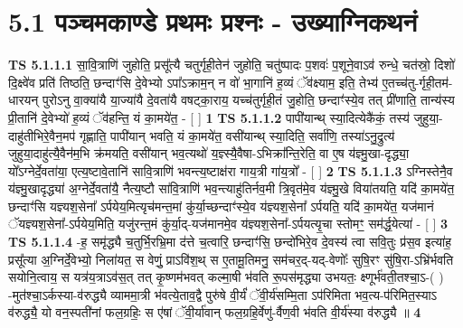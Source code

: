 \documentclass[17pt]{extarticle}
\begin{document}
     \section*{ 5.1      पञ्चमकाण्डे प्रथमः प्रश्नः - उख्याग्निकथनं }
                                        \textbf{ TS 5.1.1.1} \newline
                  सा॒वि॒त्राणि॑ जुहोति॒ प्रसू᳚त्यै चतुर्गृही॒तेन॑ जुहोति॒ चतु॑ष्पादः प॒शवः॑ प॒शूने॒वाऽव॑ रुन्धे॒ चत॑स्रो॒ दिशो॑ दि॒क्ष्वे॑व प्रति॑ तिष्ठति॒ छन्दाꣳ॑सि दे॒वेभ्यो ऽपा᳚ऽक्राम॒न् न वो॑ भा॒गानि॑ ह॒व्यं ॅव॑क्ष्याम॒ इति॒ तेभ्य॑ ए॒तच्च॑तु-र्गृही॒तम॑-धारयन् पुरोऽनु वा॒क्या॑यै या॒ज्या॑यै दे॒वता॑यै वषट्का॒राय॒ यच्च॑तुर्गृही॒तं जु॒होति॒ छन्दाꣳ॑स्ये॒व तत् प्री॑णाति॒ तान्य॑स्य प्री॒तानि॑ दे॒वेभ्यो॑ ह॒व्यं ॅव॑हन्ति॒ यं का॒मये॑त॒ - [  ] \textbf{  1} \newline
                  \newline
                                \textbf{ TS 5.1.1.2} \newline
                  पापी॑यान्थ् स्या॒दित्येकै॑कं॒ तस्य॑ जुहुया॒-दाहु॑तीभिरे॒वैन॒मप॑ गृह्णाति॒ पापी॑यान् भवति॒ यं का॒मये॑त॒ वसी॑यान्थ् स्या॒दिति॒ सर्वा॑णि॒ तस्या॑ऽनु॒द्रुत्य॑ जुहुया॒दाहु॑त्यै॒वैन॑म॒भि क्र॑मयति॒ वसी॑यान् भव॒त्यथो॑ य॒ज्ञ्स्यै॒वैषा-ऽभिक्रा᳚न्ति॒रेति॒ वा ए॒ष य॑ज्ञ्मु॒खा-दृद्ध्या॒ यो᳚ऽग्नेर्दे॒वता॑या॒ एत्य॒ष्टावे॒तानि॑ सावि॒त्राणि॑ भवन्त्य॒ष्टाक्ष॑रा गाय॒त्री गा॑य॒त्रो᳚ - [  ] \textbf{  2} \newline
                  \newline
                                \textbf{ TS 5.1.1.3} \newline
                  ऽग्निस्तेनै॒व य॑ज्ञ्मु॒खादृद्ध्या॑ अ॒ग्नेर्दे॒वता॑यै॒ नैत्य॒ष्टौ सा॑वि॒त्राणि॑ भव॒न्त्याहु॑तिर्नव॒मी त्रि॒वृत॑मे॒व य॑ज्ञ्मु॒खे विया॑तयति॒ यदि॑ का॒मये॑त॒ छन्दाꣳ॑सि यज्ञ्यश॒सेना᳚ ऽर्पयेय॒मित्यृच॑मन्त॒मां कु॑र्या॒च्छन्दाꣳ॑स्ये॒व य॑ज्ञ्यश॒सेना᳚ ऽर्पयति॒ यदि॑ का॒मये॑त॒ यज॑मानं ॅयज्ञ्यश॒सेना᳚-ऽर्पयेय॒मिति॒ यजु॑रन्त॒मं कु॑र्या॒द्-यज॑मानमे॒व य॑ज्ञ्यश॒सेना᳚-ऽर्पयत्यृ॒चा स्तोमꣳ॒॒ सम॑र्द्ध॒येत्या॑ - [  ] \textbf{  3} \newline
                  \newline
                                \textbf{ TS 5.1.1.4} \newline
                  -ह॒ समृ॑द्ध्यै च॒तुर्भि॒रभ्रि॒मा द॑त्ते च॒त्वारि॒ छन्दाꣳ॑सि॒ छन्दो॑भिरे॒व दे॒वस्य॑ त्वा सवि॒तुः प्र॑स॒व इत्या॑ह॒ प्रसू᳚त्या अ॒ग्निर्दे॒वेभ्यो॒ निला॑यत॒ स वेणुं॒ प्राऽवि॑श॒थ् स ए॒तामू॒तिमनु॒ सम॑चर॒द्-यद्-वेणोः᳚ सुषि॒रꣳ सु॑षि॒रा-ऽभ्रि॑र्भवति सयोनि॒त्वाय॒ स यत्र॑य॒त्राऽव॑स॒त् तत् कृ॒ष्णम॑भवत् कल्मा॒षी भ॑वति रू॒पस॑मृद्ध्या उभयतः॒ क्ष्णूर्भ॑वती॒तश्चा॒ऽ-( ) -मुत॑श्चा॒ऽर्कस्या-व॑रुद्ध्यै व्याममा॒त्री भ॑वत्ये॒ताव॒द्वै पुरु॑षे वी॒र्यं॑ ॅवी॒र्य॑सम्मि॒ता ऽप॑रिमिता भव॒त्य-प॑रिमित॒स्याऽ व॑रुद्ध्यै॒ यो वन॒स्पती॑नां फल॒ग्रहिः॒ स ए॑षां ॅवी॒र्या॑वान् फल॒ग्रहि॒र्वेणु॑-र्वैण॒वी भ॑वति वी॒र्य॑स्या व॑रुद्ध्यै ॥ \textbf{  4} \newline
\end{document}
